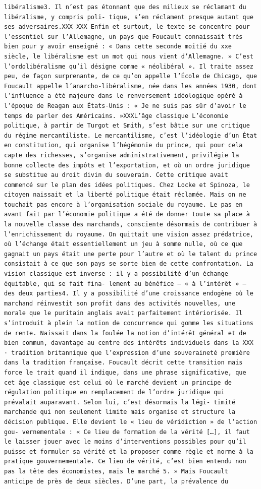 \documentclass[
]{book}
\begin{document}
\begin{verbatim}
libéralisme3. Il n’est pas étonnant que des milieux se réclamant du libéralisme, y compris poli- tique, s’en réclament presque autant que ses adversaires.XXX XXX Enfin et surtout, le texte se concentre pour l’essentiel sur l’Allemagne, un pays que Foucault connaissait très bien pour y avoir enseigné : « Dans cette seconde moitié du xxe siècle, le libéralisme est un mot qui nous vient d’Allemagne. » C’est l’ordolibéralisme qu’il désigne comme « néolibéral ». Il traite assez peu, de façon surprenante, de ce qu’on appelle l’École de Chicago, que Foucault appelle l’anarcho-libéralisme, née dans les années 1930, dont l’influence a été majeure dans le renversement idéologique opéré à l’époque de Reagan aux États-Unis : « Je ne suis pas sûr d’avoir le temps de parler des Américains. »XXXL’âge classique L’économie politique, à partir de Turgot et Smith, s’est bâtie sur une critique du régime mercantiliste. Le mercantilisme, c’est l’idéologie d’un État en constitution, qui organise l’hégémonie du prince, qui pour cela capte des richesses, s’organise administrativement, privilégie la bonne collecte des impôts et l’exportation, et où un ordre juridique se substitue au droit divin du souverain. Cette critique avait commencé sur le plan des idées politiques. Chez Locke et Spinoza, le citoyen naissait et la liberté politique était réclamée. Mais on ne touchait pas encore à l’organisation sociale du royaume. Le pas en avant fait par l’économie politique a été de donner toute sa place à la nouvelle classe des marchands, consciente désormais de contribuer à l’enrichissement du royaume. On quittait une vision assez prédatrice, où l’échange était essentiellement un jeu à somme nulle, où ce que gagnait un pays était une perte pour l’autre et où le talent du prince consistait à ce que son pays se sorte bien de cette confrontation. La vision classique est inverse : il y a possibilité d’un échange équitable, qui se fait fina- lement au bénéfice – « à l’intérêt » – des deux parties4. Il y a possibilité d’une croissance endogène où le marchand réinvestit son profit dans des activités nouvelles, une morale que le puritain anglais avait parfaitement intériorisée. Il s’introduit à plein la notion de concurrence qui gomme les situations de rente. Naissait dans la foulée la notion d’intérêt général et de bien commun, davantage au centre des intérêts individuels dans la XXX · tradition britannique que l’expression d’une souveraineté première dans la tradition française. Foucault décrit cette transition mais force le trait quand il indique, dans une phrase significative, que cet âge classique est celui où le marché devient un principe de régulation politique en remplacement de l’ordre juridique qui prévalait auparavant. Selon lui, c’est désormais la légi- timité marchande qui non seulement limite mais organise et structure la décision publique. Elle devient le « lieu de véridiction » de l’action gou- vernementale : « Ce lieu de formation de la vérité […], il faut le laisser jouer avec le moins d’interventions possibles pour qu’il puisse et formuler sa vérité et la proposer comme règle et norme à la pratique gouvernementale. Ce lieu de vérité, c’est bien entendu non pas la tête des économistes, mais le marché 5. » Mais Foucault anticipe de près de deux siècles. D’une part, la prévalence du 
\end{verbatim}
\end{document}
